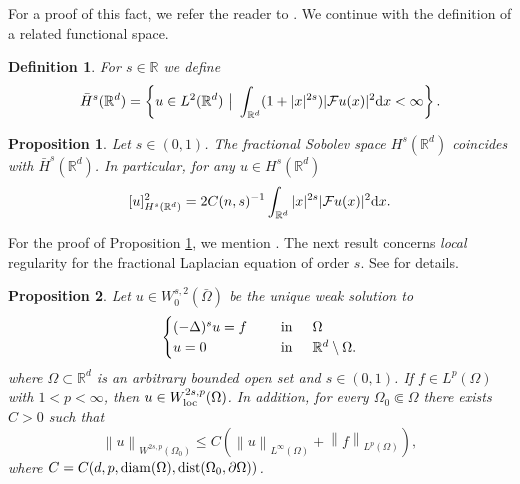 \documentclass[10pt]{article} %
\newtheorem{Definition}{Definition}
\newtheorem{Proposition}{Proposition}
\def \suchthat {\ \big | \ }
\begin{document}
For a proof of this fact, we refer the reader to \cite[Proposition 3.3]{Nezza-Palatucci-Valdinoci2012}. We continue with the definition of a related functional space.

\begin{Definition}
For $s\in\mathbb{R}$ we define
\[
\bar{H}^s(\mathbb{R}^d) = \left\{u \in L^2(\mathbb{R}^d) \suchthat \int_{\mathbb{R}^d}(1 + |x|^{2s})|{\mathcal F}u(x)|^2{\rm d}x < \infty \right\}.
\]
\end{Definition}

\begin{Proposition}\label{prop_coincspac}
Let $s \in (0,1)$. The fractional Sobolev space $H^s(\mathbb{R}^d)$ coincides with $\bar{H}^s(\mathbb{R}^d)$. In particular, for any $u \in H^s(\mathbb{R}^d)$
\[
[u]^2_{H^s(\mathbb{R}^d)} = 2C(n,s)^{-1}\int_{\mathbb{R}^d}|x|^{2s}|{\mathcal F}u(x)|^2{\rm d}x.
\]
\end{Proposition}

For the proof of Proposition \ref{prop_coincspac}, we mention \cite[Proposition 3.4]{Nezza-Palatucci-Valdinoci2012}. The next result concerns \emph{local} regularity for the fractional Laplacian equation of order $s$. See \cite[Theorem 1.4]{Biccari-Warma-Zuazua2017} for details.

\begin{Proposition}\label{prop_lapfrac}
Let $u \in W_0^{s,2}(\bar{\Omega})$ be the unique weak solution to
\begin{equation}\label{zuzua_result}
	\begin{cases}
		(-\Delta)^su =f&  \hspace{.2in}  \text{in} \hspace{.2in}   \Omega \\
		u = 0&   \hspace{.2in}  \text{in} \hspace{.2in}  \mathbb{R}^d\setminus \Omega.
	\end{cases}
\end{equation}
where $\Omega \subset \mathbb{R}^d$ is an arbitrary bounded open set and $s \in (0,1)$. %
If $f\in L^{p}(\Omega)$ with $1<p<\infty$, then $u\in W^{2s,p}_{\rm loc}(\Omega)$. In addition, for every $\Omega_0\Subset\Omega$ there exists $C>0$ such that 
\[
	\left\|u\right\|_{W^{2s,p}(\Omega_0)} \leq C\left(\left\|u\right\|_{L^\infty(\Omega)}+\left\|f\right\|_{L^p(\Omega)}\right),
\]
where $C=C(d,p,{\rm diam}(\Omega),{\rm dist}(\Omega_0,\partial\Omega))$.
\end{Proposition}
\end{document}
